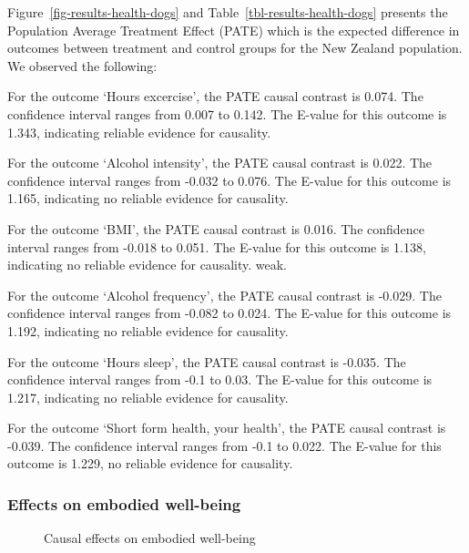 \documentclass[
  singlecolumn,
  9pt]{article}
\begin{document}
Figure~\ref{fig-results-health-dogs} and
Table~\ref{tbl-results-health-dogs} presents the Population Average
Treatment Effect (PATE) which is the expected difference in outcomes
between treatment and control groups for the New Zealand population. We
observed the following:

For the outcome `Hours excercise', the PATE causal contrast is 0.074.
The confidence interval ranges from 0.007 to 0.142. The E-value for this
outcome is 1.343, indicating reliable evidence for causality.

For the outcome `Alcohol intensity', the PATE causal contrast is 0.022.
The confidence interval ranges from -0.032 to 0.076. The E-value for
this outcome is 1.165, indicating no reliable evidence for causality.

For the outcome `BMI', the PATE causal contrast is 0.016. The confidence
interval ranges from -0.018 to 0.051. The E-value for this outcome is
1.138, indicating no reliable evidence for causality. weak.

For the outcome `Alcohol frequency', the PATE causal contrast is -0.029.
The confidence interval ranges from -0.082 to 0.024. The E-value for
this outcome is 1.192, indicating no reliable evidence for causality.

For the outcome `Hours sleep', the PATE causal contrast is -0.035. The
confidence interval ranges from -0.1 to 0.03. The E-value for this
outcome is 1.217, indicating no reliable evidence for causality.

For the outcome `Short form health, your health', the PATE causal
contrast is -0.039. The confidence interval ranges from -0.1 to 0.022.
The E-value for this outcome is 1.229, no reliable evidence for
causality.

\newpage{}

\subsubsection{Effects on embodied
well-being}\label{effects-on-embodied-well-being-1}

\begin{figure}


\caption{\label{fig-results-embodied-dogs}Causal effects on embodied
well-being}

\end{figure}%
\end{document}
